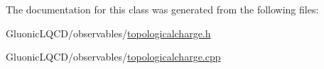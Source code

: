 The documentation for this class was generated from the following files\+:\begin{DoxyCompactItemize}
\item 
Gluonic\+L\+Q\+C\+D/observables/\mbox{\hyperlink{topologicalcharge_8h}{topologicalcharge.\+h}}\item 
Gluonic\+L\+Q\+C\+D/observables/\mbox{\hyperlink{topologicalcharge_8cpp}{topologicalcharge.\+cpp}}\end{DoxyCompactItemize}

